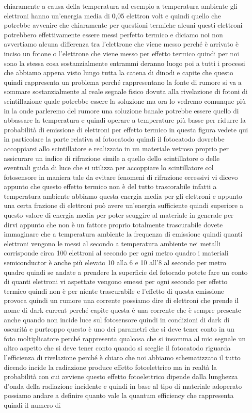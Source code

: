chiaramente a causa della temperatura ad esempio a temperatura ambiente gli elettroni hanno un'energia media di 0,05 elettron volt e quindi quello che potrebbe avvenire che chiaramente per questioni termiche alcuni questi elettroni potrebbero effettivamente essere messi perfetto termico e diciamo noi non avvertiamo alcuna differenza tra l'elettrone che viene messo perché è arrivato è inciso un fotone o l'elettrone che viene messo per effetto termico quindi per noi sono la stessa cosa sostanzialmente entrammi deranno luogo poi a tutti i processi che abbiamo appena visto lungo tutta la catena di dinodi e capite che questo quindi rappresenta un problema perché rappresentano la fonte di rumore si va a sommare sostanzialmente al reale segnale fisico dovuta alla rivelazione di fotoni di scintillazione quale potrebbe essere la soluzione ma ora lo vedremo comunque più in la onde parleremo del rumore una soluzione banale potrebbe essere quello di abbassare la temperatura e quindi operare a temperature più basse per ridurre la probabilità di emissione di elettroni per effetto termico in questa figura vedete qui in particolare la parte relativa al fotocatodo quindi il fotocatodo dovrebbe accoppiarsi allo scintillatore e realizzato in un materiale vetroso proprio per assicurare un indice di rifrazione simile a quello dello scintillatore o delle eventuali guida di luce che si utilizza per accoppiare lo scintillatore col fotosensore in maniera tale da evitare fenomeni di rifrazione eccessivi vi dicevo appunto che questo effetto termico non è del tutto trascorabile infatti a temperatura ambiente abbiamo questa energia media per gli elettroni e appunto una certa frazione di elettroni può avere un'energia sufficiente quindi superiore a questo valore di energia media per poter scuggire al materiale in generale per dirvi appunto che non è un fattore proprio totalmente trascurabile dovete immaginare che a temperatura ambiente la frequenza di emissione quindi quanti elettroni vengono le messi al secondo a temperatura ambiente nei metalli corrisponde circa 100 elettroni al secondo per ogni metro quadro i materiali semiconductor è anche più elevato 10 alla 6 e 10 all'8 al secondo per metro quadro quindi se andate a prendere la superficie del fotocado potete fare un conto di quanti elettroni vi aspettate vengono emessi per ogni secondo per effetto termico quindi non è per niente trascurabile e l'effetto di questa emissione provoca quindi un rumore una corrente possiamo dire di elettroni che prende il nome di dark current perché capite questa è una corrente che è sempre presente anche quando non incide luce sul fotosensore quindi in condizioni di dark di oscurità e purtroppo questo è uno dei parametri che si deve tener conto in un foto moltiplicatore perché rappresenta qualcosa che si insomma al mio segnale un altro aspetto che si deve tener conto quando si sceglie il fotocatodo riguarda l'efficienza di rivelazione perché è chiaro che noi abbiamo schematizzato il tutto dicendo incide la radiazione produce effetto fotoelettrico ma in realtà la probabilità con cui avviene questo effetto fotoelettrico dipende dalla lunghezza d'onda della radiazione incidente e quindi in base al tipo di materiale adoperato possiamo andare a definire quanto vale la quantum efficiency che rappresenta quindi il numero di 